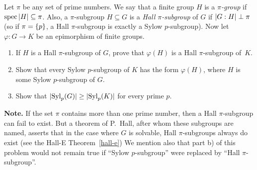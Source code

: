 \begin{probl}\label{problem-1.B.5}
    Let $\pi$ be any set of prime numbers. We say that a finite group\/ $H$ is a \textsl{$\pi$-group} if\/ $\operatorname{spec}\left\vert{H}\right\vert\subseteq\pi$. Also, a\/ $\pi$-subgroup $H \subseteq G$ is a \textsl{Hall $\pi$-subgroup} of\/ $G$ if\/ $\left\vert{G:H}\right\vert\perp\pi$ (so if\/ $\pi = \{p\}$, a Hall\/ $\pi$-subgroup is exactly a Sylow $p$-subgroup). Now let $\varphi\colon G \to K$ be an epimorphism of finite groups. 
    \begin{enumerate}[\rm a)]
        \item If\/ $H$ is a Hall\/ $\pi$-subgroup of\/ $G$, prove that $\varphi(H)$ is a Hall\/ $\pi$-subgroup of\/~$K$.

        \item Show that every Sylow $p$-subgroup of $K$ has the form $\varphi(H)$, where $H$ is some Sylow $p$-subgroup of\/ $G$. 
        
        \item Show that $|{\rm Syl}_p(G)|\ge|{\rm Syl}_p(K)|$ for every prime $p$.
    \end{enumerate}

    \textrm{\rm\textbf{Note.} If the set $\pi$ contains more than one prime number, then a Hall $\pi$-subgroup can fail to exist. But a theorem of\/ P.~Hall, after whom these subgroups are named, asserts that in the case where $G$ is solvable, Hall $\pi$-subgroups always do exist (see the Hall-E Theorem~\ref{hall-e}) We mention also that part b) of this problem would not remain true if ``Sylow $p$-subgroup'' were replaced by ``Hall $\pi$-subgroup''.}
\end{probl}

